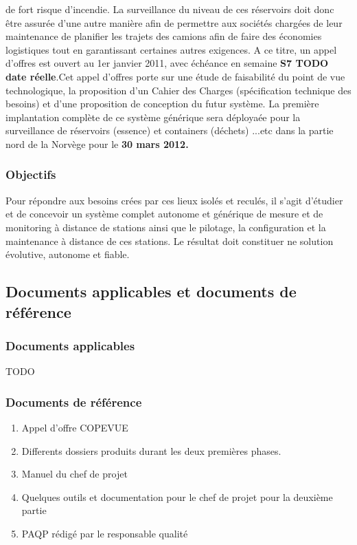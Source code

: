 de fort risque d'incendie.
La surveillance du niveau de ces réservoirs doit donc être assurée d'une autre manière afin de permettre aux sociétés chargées de leur maintenance de planifier les trajets des camions
afin de faire des économies logistiques tout en garantissant certaines autres exigences.
A ce titre, un appel d'offres est ouvert au 1er janvier 2011, avec échéance en semaine \textbf{S7 TODO date réelle}.Cet appel d'offres porte sur une étude
de faisabilité du point de vue technologique, la proposition d'un Cahier des Charges (spécification technique des besoins) et d'une proposition 
de conception du futur système.
La première implantation complète de ce système générique sera déployaée pour la surveillance de réservoirs (essence) et containers (déchets) ...etc
dans la partie nord de la Norvège pour le \textbf{30 mars 2012.}

\subsubsection{Objectifs}
Pour répondre aux besoins crées par ces lieux isolés et reculés, il s'agit d'étudier et de concevoir un système complet autonome et générique de mesure et de monitoring à distance de stations ainsi 
que le pilotage, la configuration et la maintenance à distance de ces stations. Le résultat doit constituer ne solution évolutive, autonome et fiable.

\subsection{Documents applicables et documents de référence}
\subsubsection{Documents applicables}
TODO 
\subsubsection{Documents de référence}
\begin{enumerate}
\item Appel d'offre COPEVUE
\item Differents dossiers produits durant les deux premières phases.
\item Manuel du chef de projet
\item Quelques outils et documentation pour le chef de projet pour la deuxième partie
\item PAQP rédigé par le responsable qualité
\end{enumerate}

